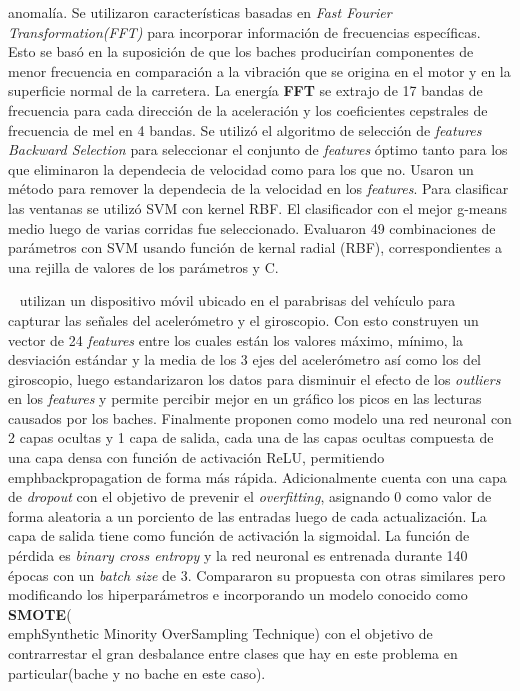 anomalía. Se utilizaron características basadas en \emph{Fast Fourier Transformation(FFT)} para incorporar información de frecuencias específicas. Esto se basó en la
suposición de que los baches producirían componentes de menor frecuencia en comparación a la vibración que se origina en el motor y en la superficie normal de la carretera.
La energía \textbf{FFT} se extrajo de 17 bandas de frecuencia para cada dirección de la aceleración y los coeficientes cepstrales de frecuencia de mel en 4 bandas. Se
utilizó el algoritmo de selección de \emph{features} \emph{Backward Selection} para seleccionar el conjunto de \emph{features} óptimo tanto para los que eliminaron la
dependecia de velocidad como para los que no. Usaron un método para remover la dependecia de la velocidad en los \emph{features}.  Para clasificar las ventanas 
se utilizó SVM con kernel RBF. El clasificador con el mejor g-means medio luego de varias corridas fue seleccionado. Evaluaron 49 combinaciones de parámetros con SVM
usando función de kernal radial (RBF), correspondientes a una rejilla de valores de los parámetros \gamma y C. 

~\cite{pawar2020efficient} utilizan un dispositivo móvil ubicado en el parabrisas del vehículo para capturar las señales del acelerómetro y el giroscopio. Con esto
construyen un vector de 24 \emph{features} entre los cuales están los valores máximo, mínimo, la desviación estándar y la media de los 3 ejes del acelerómetro así
como los del giroscopio, luego estandarizaron los datos para disminuir el efecto de los \emph{outliers} en los \emph{features} y permite percibir mejor en un gráfico
los picos en las lecturas causados por los baches. Finalmente proponen como modelo una red neuronal con 2 capas ocultas y 1 capa de salida, cada una de las capas ocultas
compuesta de una capa densa con función de activación ReLU, permitiendo \\emph{backpropagation} de forma más rápida. Adicionalmente cuenta con una capa de \emph{dropout}
con el objetivo de prevenir el \emph{overfitting}, asignando 0 como valor de forma aleatoria a un porciento de las entradas luego de cada actualización. La capa de salida 
tiene como función de activación la sigmoidal. La función de pérdida es \emph{binary cross entropy} y la red neuronal es entrenada durante 140 épocas con un \emph{batch size}
de 3. Compararon su propuesta con otras similares pero modificando los hiperparámetros e incorporando un modelo conocido como \textbf{SMOTE}(\\emph{Synthetic Minority
OverSampling Technique}) con el objetivo de contrarrestar el gran desbalance entre clases que hay en este problema en particular(bache y no bache en este caso).

